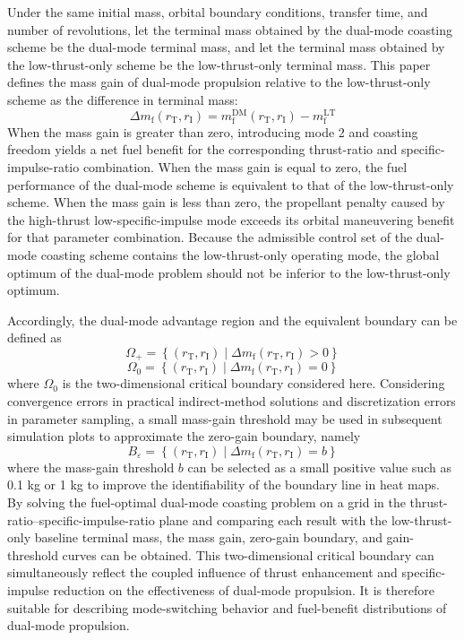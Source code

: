 \documentclass{IEEEtaes}
\begin{document}
Under the same initial mass, orbital boundary conditions, transfer time, and number of revolutions, let the terminal mass obtained by the dual-mode coasting scheme be the dual-mode terminal mass, and let the terminal mass obtained by the low-thrust-only scheme be the low-thrust-only terminal mass. This paper defines the mass gain of dual-mode propulsion relative to the low-thrust-only scheme as the difference in terminal mass:
\begin{equation}
\Delta m_{\mathrm{f}}(r_{\mathrm{T}},r_{\mathrm{I}})=m_{\mathrm{f}}^{\mathrm{DM}}(r_{\mathrm{T}},r_{\mathrm{I}})-m_{\mathrm{f}}^{\mathrm{LT}}
\end{equation}
When the mass gain is greater than zero, introducing mode 2 and coasting freedom yields a net fuel benefit for the corresponding thrust-ratio and specific-impulse-ratio combination. When the mass gain is equal to zero, the fuel performance of the dual-mode scheme is equivalent to that of the low-thrust-only scheme. When the mass gain is less than zero, the propellant penalty caused by the high-thrust low-specific-impulse mode exceeds its orbital maneuvering benefit for that parameter combination. Because the admissible control set of the dual-mode coasting scheme contains the low-thrust-only operating mode, the global optimum of the dual-mode problem should not be inferior to the low-thrust-only optimum.

Accordingly, the dual-mode advantage region and the equivalent boundary can be defined as
\begin{equation}
\Omega_{+}=\left\{(r_{\mathrm{T}},r_{\mathrm{I}})\mid \Delta m_{\mathrm{f}}(r_{\mathrm{T}},r_{\mathrm{I}})>0\right\}
\end{equation}
\begin{equation}
\Omega_{0}=\left\{(r_{\mathrm{T}},r_{\mathrm{I}})\mid \Delta m_{\mathrm{f}}(r_{\mathrm{T}},r_{\mathrm{I}})=0\right\}
\end{equation}
where $\Omega_{0}$ is the two-dimensional critical boundary considered here. Considering convergence errors in practical indirect-method solutions and discretization errors in parameter sampling, a small mass-gain threshold may be used in subsequent simulation plots to approximate the zero-gain boundary, namely
\begin{equation}
B_{\varepsilon}=\left\{(r_{\mathrm{T}},r_{\mathrm{I}})\mid \Delta m_{\mathrm{f}}(r_{\mathrm{T}},r_{\mathrm{I}})=b\right\}
\end{equation}
where the mass-gain threshold $b$ can be selected as a small positive value such as 0.1 kg or 1 kg to improve the identifiability of the boundary line in heat maps. By solving the fuel-optimal dual-mode coasting problem on a grid in the thrust-ratio--specific-impulse-ratio plane and comparing each result with the low-thrust-only baseline terminal mass, the mass gain, zero-gain boundary, and gain-threshold curves can be obtained. This two-dimensional critical boundary can simultaneously reflect the coupled influence of thrust enhancement and specific-impulse reduction on the effectiveness of dual-mode propulsion. It is therefore suitable for describing mode-switching behavior and fuel-benefit distributions of dual-mode propulsion.
\end{document}

